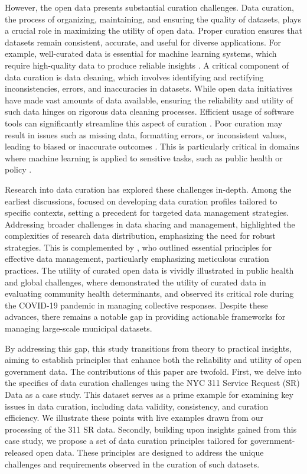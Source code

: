 \documentclass[linenumber]{jdsart}
\begin{document}
However, the open data presents substantial curation challenges.
Data curation, the process of organizing, maintaining, and ensuring
the quality of datasets, plays a crucial role in maximizing the
utility of open data. Proper curation ensures that datasets remain
consistent, accurate, and useful for diverse applications. For example, 
well-curated data is essential for machine learning systems, which 
require high-quality data to produce reliable insights 
\citep{polyzotis2019data, jain2020overview}. A critical component of 
data curation is data cleaning, which involves identifying and rectifying 
inconsistencies, errors, and inaccuracies in datasets. While open data 
initiatives have made vast amounts of data available, ensuring the 
reliability and utility of such data hinges on rigorous data cleaning processes. 
Efficient usage of software tools can significantly streamline this 
aspect of curation \citep[e.g.,][]{cody2017cody, van2018statistical}. Poor 
curation may result in issues such as missing data, formatting errors, 
or inconsistent values, leading to biased or inaccurate outcomes 
\citep{geiger2020garbage}. This is particularly critical in domains 
where machine learning is applied to sensitive tasks, such as public 
health or policy \citep{rahm2000data}. 


Research into data curation has explored these challenges in-depth. 
Among the earliest discussions, \citet{witt2009constructing} focused 
on developing data curation profiles tailored to specific contexts, 
setting a precedent for targeted data management strategies. 
Addressing broader challenges in data sharing and management, 
\citet{borgman2012conundrum} highlighted the complexities of 
research data distribution, emphasizing the need for robust 
strategies. This is complemented by \citet{hart2016ten}, who outlined 
essential principles for effective data management, particularly 
emphasizing meticulous curation practices. The utility of curated 
open data is vividly illustrated in public health and global challenges, 
where \citet{cantor2018facets} demonstrated the utility of curated 
data in evaluating community health determinants, and 
\citet{shankar2021data} observed its critical role during the 
COVID-19 pandemic in managing collective responses.
Despite these advances, there remains a notable gap in providing
actionable frameworks for managing large-scale municipal datasets.


By addressing this gap, this study transitions from theory to
practical insights, aiming to establish principles that enhance both
the reliability and utility of open government data.
The contributions of this paper are twofold. First, we delve into
the specifics of data curation challenges using the NYC 311 Service
Request (SR) Data as a case study. This dataset serves as a prime 
example for examining key issues in data curation, including data 
validity, consistency, and curation efficiency. We illustrate these 
points with live examples drawn from our 
processing of the 311 SR data. Secondly, building upon insights 
gained from this case study, we propose a set of data curation 
principles tailored for government-released open data. These 
principles are designed to address the unique challenges 
and requirements observed in the curation of such datasets.
\end{document}
